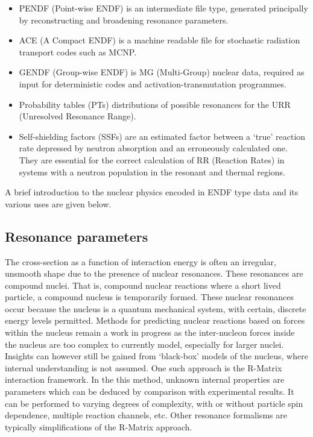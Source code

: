 \begin{itemize}
  \item PENDF (Point-wise ENDF) is an intermediate file type, generated principally by reconstructing and broadening resonance parameters.
  \item ACE (A Compact ENDF) is a machine readable file for stochastic radiation transport codes such as MCNP. 
  \item GENDF (Group-wise ENDF) is MG (Multi-Group) nuclear data, required as input for deterministic codes and activation-transmutation programmes.
  \item Probability tables (PTs) distributions of possible resonances for the URR (Unresolved Resonance Range).
  \item Self-shielding factors (SSFs) are an estimated factor between a `true' reaction rate depressed by neutron absorption and an erroneously calculated one. They are essential for the correct calculation of RR (Reaction Rates) in systems with a neutron population in the resonant and thermal regions.
\end{itemize}

A brief introduction to the nuclear physics encoded in ENDF type data and its various uses are given below.

\subsection{Resonance parameters}
The cross-section as a function of interaction energy is often an irregular, unsmooth shape due to the presence of nuclear resonances. These resonances are compound nuclei. That is, compound nuclear reactions where a short lived particle, a compound nucleus is temporarily formed. These nuclear resonances occur because the nucleus is a quantum mechanical system, with certain, discrete energy levels permitted. Methods for predicting nuclear reactions based on forces within the nucleus remain a work in progress as the inter-nucleon forces inside the nucleus are too complex to currently model, especially for larger nuclei. Insights can however still be gained from `black-box' models of the nucleus, where internal understanding is not assumed. One such approach is the R-Matrix interaction framework. In the this method, unknown internal properties are parameters which can be deduced by comparison with experimental results. It can be performed to varying degrees of complexity, with or without particle spin dependence, multiple reaction channels, etc. Other resonance formalisms are typically simplifications of the R-Matrix approach.

